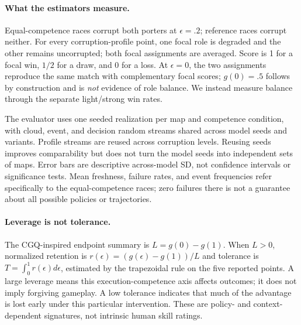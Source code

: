 \begin{table}[htbp]
\centering
\caption{Matched held-out ablation. Values are means $\pm$ population SD over
three trained seeds, each evaluated on the same 100 maps. All entries are
fractions or normalized scores, not percentages. Base includes viability,
luck, and regularization; later stages add balance, role specialization, and
jointly skill plus weather.}
\label{tab:ablation}
\small

\end{table}

\paragraph{What the estimators measure.}
Equal-competence races corrupt both porters at $\epsilon=.2$; reference races
corrupt neither. For every corruption-profile point, one focal role is degraded
and the other remains uncorrupted; both focal assignments are averaged. Score
is 1 for a focal win, $1/2$ for a draw, and 0 for a loss. At $\epsilon=0$, the
two assignments reproduce the same match with complementary focal scores;
$g(0)=.5$ follows by construction and is \emph{not} evidence of role balance.
We instead measure balance through the separate light/strong win rates.

The evaluator uses one seeded realization per map and competence condition,
with cloud, event, and decision random streams shared across model seeds and
variants. Profile streams are reused across corruption levels. Reusing seeds
improves comparability but does not turn the model seeds into independent sets
of maps. Error bars are descriptive across-model SD, not confidence intervals
or significance tests. Mean freshness, failure rates, and event frequencies
refer specifically to the equal-competence races; zero failures there is not a
guarantee about all possible policies or trajectories.

\paragraph{Leverage is not tolerance.}
The CGQ-inspired endpoint summary is $L=g(0)-g(1)$. When $L>0$, normalized
retention is $r(\epsilon)=(g(\epsilon)-g(1))/L$ and tolerance is
$T=\int_0^1r(\epsilon)d\epsilon$, estimated by the trapezoidal rule on the five
reported points. A large leverage means this execution-competence axis affects
outcomes; it does not imply forgiving gameplay. A low tolerance indicates that
much of the advantage is lost early under this particular intervention. These
are policy- and context-dependent signatures, not intrinsic human skill ratings.

